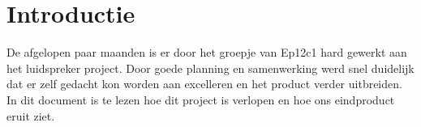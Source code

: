 \section{Introductie}
De afgelopen paar maanden is er door het groepje van Ep12c1 hard gewerkt aan het luidspreker project. Door goede planning en samenwerking werd snel duidelijk dat er zelf gedacht kon worden aan excelleren en het product verder uitbreiden. In dit document is te lezen hoe dit project is verlopen en hoe ons eindproduct eruit ziet. 